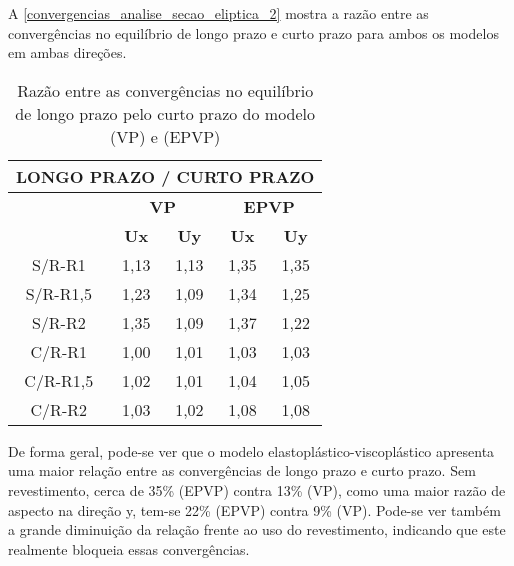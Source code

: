 A \autoref{convergencias_analise_secao_eliptica_2} mostra a razão entre as convergências no equilíbrio de longo prazo e curto prazo para ambos os modelos em ambas direções.
\begin{table}[H]
	\caption{Razão entre as convergências no equilíbrio de longo prazo pelo curto prazo do modelo (VP) e (EPVP)}
	\label{convergencias_analise_secao_eliptica_2}
	\centering
	\small
	\renewcommand{\arraystretch}{1.25}
	\begin{tabular}{c c c c c}
		\hline
		\multicolumn{5}{c}{\textbf{LONGO PRAZO / CURTO PRAZO}}\\	
		\hline
		\multicolumn{1}{c}{} &
		\multicolumn{2}{c}{\textbf{VP}} &
		\multicolumn{2}{c}{\textbf{EPVP}}	\\
		\multicolumn{1}{c}{} &
		\multicolumn{1}{c}{\textbf{Ux}} &
		\multicolumn{1}{c}{\textbf{Uy}} &
		\multicolumn{1}{c}{\textbf{Ux}} &
		\multicolumn{1}{c}{\textbf{Uy}} \\
		\hline
		S/R-R1	 &	1,13 &	1,13 &	1,35 &	1,35 \\
		S/R-R1,5 &	1,23 &	1,09 &	1,34 &	1,25 \\
		S/R-R2	 &	1,35 &	1,09 &	1,37 &	1,22 \\
		C/R-R1	 &	1,00 &	1,01 &	1,03 &	1,03 \\
		C/R-R1,5 &	1,02 &	1,01 &	1,04 &	1,05 \\
		C/R-R2	 &	1,03 &	1,02 &	1,08 &	1,08 \\
		\hline
	\end{tabular}
	\normalsize
\end{table}
De forma geral, pode-se ver que o modelo elastoplástico-viscoplástico apresenta uma maior relação entre as convergências de longo prazo e curto prazo. Sem revestimento, cerca de 35\% (EPVP) contra 13\% (VP), como uma maior razão de aspecto na direção y, tem-se 22\% (EPVP) contra 9\% (VP). Pode-se ver também a grande diminuição da relação frente ao uso do revestimento, indicando que este realmente bloqueia essas convergências.




